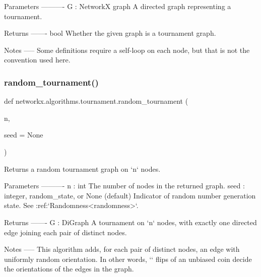 \begin{DoxyVerb}
\begin{DoxyVerb}
Parameters
----------
G : NetworkX graph
    A directed graph representing a tournament.

Returns
-------
bool
    Whether the given graph is a tournament graph.

Notes
-----
Some definitions require a self-loop on each node, but that is not
the convention used here.\end{DoxyVerb}
 \mbox{\label{namespacenetworkx_1_1algorithms_1_1tournament_ad7bd679c817dc73450fc323ed6229ca0}} 
\subsubsection{\texorpdfstring{random\+\_\+tournament()}{random\_tournament()}}
{\footnotesize\ttfamily def networkx.\+algorithms.\+tournament.\+random\+\_\+tournament (\begin{DoxyParamCaption}\item[{}]{n,  }\item[{}]{seed = {\ttfamily None} }\end{DoxyParamCaption})}

\begin{DoxyVerb}Returns a random tournament graph on `n` nodes.

Parameters
----------
n : int
    The number of nodes in the returned graph.
seed : integer, random_state, or None (default)
    Indicator of random number generation state.
    See :ref:`Randomness<randomness>`.

Returns
-------
G : DiGraph
    A tournament on `n` nodes, with exactly one directed edge joining
    each pair of distinct nodes.

Notes
-----
This algorithm adds, for each pair of distinct nodes, an edge with
uniformly random orientation. In other words, `` flips
of an unbiased coin decide the orientations of the edges in the
graph.\end{DoxyVerb}
 \mbox{\label{namespacenetworkx_1_1algorithms_1_1tournament_af22537a4c3e27c60abf92e5ab0dded40}} 

\end{DoxyVerb}

